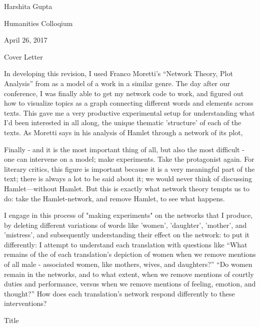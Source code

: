 \documentclass[12pt]{article}
\newenvironment{coverletter}{\begin{center} Cover Letter \end{center}}{\newpage }
\begin{document}
\begin{flushleft}
	

\begin{spacing}{2.0}
Harshita Gupta

Humanities Colloqium 

April 26, 2017

\begin{coverletter}
\singlespacing
In developing this revision, I used Franco Moretti's ``Network Theory, Plot Analysis'' from  as a model of a work in a similar genre. The day after our conference, I was finally able to get my network code to work, and figured out how to visualize topics as a graph connecting different words and elements across texts. This gave me a very productive experimental setup for understanding what I'd been interested in all along, the unique thematic 'structure' of each of the texts. As Moretti says in his analysis of Hamlet through a network of its plot, 

\begin{displayquote}
Finally - and it is the most important thing of all, but also the most difficult - one can intervene on a model; make experiments. Take the protagonist again. For literary critics, this figure is important because it is a very meaningful part of the text; there is always a lot to be said about it; we would never think of discussing Hamlet—without Hamlet. But this is exactly what network theory tempts us to do: take the Hamlet-network, and remove Hamlet, to see what happens.	
\end{displayquote}

I engage in this process of "making experiments" on the networks that I produce, by deleting different variations of words like 'women', 'daughter', 'mother', and 'mistress', and subsequently understanding their effect on the network: to put it differently: I attempt to understand each translation with questions like ``What remains of the of each translation's depiction of women when we remove mentions of all male - associated women, like mothers, wives, and daughters?'' ``Do women remain in the networks, and to what extent, when we remove mentions of courtly duties and performance, versus when we remove mentions of feeling, emotion, and thought?'' How does each translation's network respond differently to these interventions?



\end{coverletter}
	

\begin{center}
Title
\end{center}


\end{spacing}
\end{flushleft}
\end{document}
